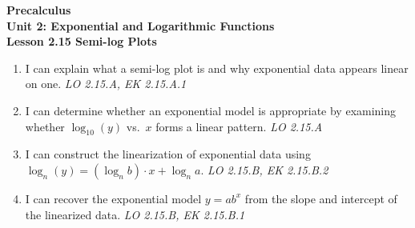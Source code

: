 \documentclass[10pt]{article}
\begin{document}
\vspace{-0.8in}

\begin{center}
  {\color{white}\textbf{\LARGE Precalculus}}\\[4pt]
  {\color{skymid}\large\textbf{Unit 2: Exponential and Logarithmic Functions}}\\[6pt]
  {\color{white}\textbf{\large Lesson 2.15 \quad Semi-log Plots}}
\end{center}

\vspace{0.22in}
\namedateperiod
\vspace{0.18in}

\begin{learningtargetbox}
\small
\begin{enumerate}[leftmargin=1.5em, itemsep=5pt]
  \item I can explain what a semi-log plot is and why exponential data appears linear on one.
        \hfill\textit{LO 2.15.A, EK 2.15.A.1}
  \item I can determine whether an exponential model is appropriate by examining whether
        $\log_{10}(y)$ vs.\ $x$ forms a linear pattern. \hfill\textit{LO 2.15.A}
  \item I can construct the linearization of exponential data using
        $\log_n(y) = (\log_n b)\cdot x + \log_n a$. \hfill\textit{LO 2.15.B, EK 2.15.B.2}
  \item I can recover the exponential model $y = ab^x$ from the slope and intercept of the
        linearized data. \hfill\textit{LO 2.15.B, EK 2.15.B.1}
\end{enumerate}
\end{learningtargetbox}

\vspace{0.14in}
\end{document}
